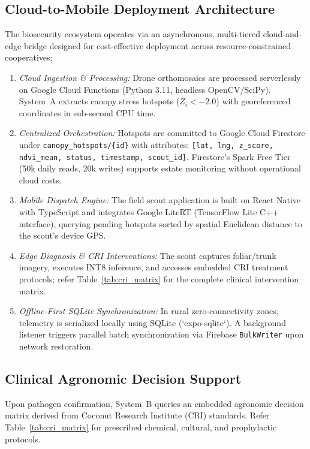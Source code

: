 \documentclass[conference,a4paper]{IEEEtran}
\begin{document}
\subsection{Cloud-to-Mobile Deployment Architecture}
The biosecurity ecosystem operates via an asynchronous, multi-tiered cloud-and-edge bridge designed for cost-effective deployment across resource-constrained cooperatives:
\begin{enumerate}[\IEEEsetlabelwidth{1)}]
    \setlength{\itemsep}{0pt}\setlength{\parskip}{0pt}
    \item \textit{Cloud Ingestion \& Processing:} Drone orthomosaics are processed serverlessly on Google Cloud Functions (Python 3.11, headless OpenCV/SciPy). System~A extracts canopy stress hotspots ($Z_i < -2.0$) with georeferenced coordinates in sub-second CPU time.
    \item \textit{Centralized Orchestration:} Hotspots are committed to Google Cloud Firestore under \texttt{canopy\_hotspots/\{id\}} with attributes: \texttt{[lat, lng, z\_score, ndvi\_mean, status, timestamp, scout\_id]}. Firestore's Spark Free Tier (50k daily reads, 20k writes) supports estate monitoring without operational cloud costs.
    \item \textit{Mobile Dispatch Engine:} The field scout application is built on React Native with TypeScript and integrates Google LiteRT (TensorFlow Lite C++ interface), querying pending hotspots sorted by spatial Euclidean distance to the scout's device GPS.
    \item \textit{Edge Diagnosis \& CRI Interventions:} The scout captures foliar/trunk imagery, executes INT8 inference, and accesses embedded CRI treatment protocols; refer Table~\ref{tab:cri_matrix} for the complete clinical intervention matrix.
    \item \textit{Offline-First SQLite Synchronization:} In rural zero-connectivity zones, telemetry is serialized locally using SQLite (`expo-sqlite`). A background listener triggers parallel batch synchronization via Firebase \texttt{BulkWriter} upon network restoration.
\end{enumerate}

\subsection{Clinical Agronomic Decision Support}
Upon pathogen confirmation, System~B queries an embedded agronomic decision matrix derived from Coconut Research Institute (CRI) standards. Refer Table~\ref{tab:cri_matrix} for prescribed chemical, cultural, and prophylactic protocols.
\end{document}
